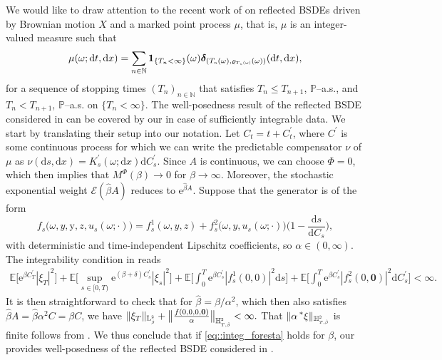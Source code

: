 \documentclass[10pt]{article} %
\newcommand\cE{\mathcal E}
\newcommand{\smalltext}[1]{\text{\fontsize{4}{4}\selectfont$#1$}}
\newcommand{\tinytext}[1]{\text{\fontsize{3}{3}\selectfont$#1$}}
\def \E{\mathbb{E}}
\def \H{\mathbb{H}}
\def \L{\mathbb{L}}
\def \N{\mathbb{N}}
\def \P{\mathbb{P}}
\newcommand{\brs}[1]{\prescript{\ast}{}{#1}}
\def\d{\mathrm{d}}
\begin{document}
We would like to draw attention to the recent work of \citeauthor*{foresta2021optimal} \cite{foresta2021optimal} on reflected BSDEs driven by Brownian motion $X$ and a marked point process $\mu$, that is, $\mu$ is an integer-valued measure such that
\begin{equation*}
	\mu(\omega; \d t, \d x) = \sum_{n \in \N} \mathbf{1}_{\{T_n < \infty\}}(\omega)\boldsymbol{\delta}_{(T_\smalltext{n}(\omega),\varrho_{\smalltext{T}_\tinytext{n}\smalltext{(}\smalltext{\omega}\smalltext{)}}(\omega))}(\d t, \d x),
\end{equation*}
for a sequence of stopping times $(T_n)_{n \in \N}$ that satisfies $T_n \leq T_{n+1}$, $\P$--a.s., and $T_n < T_{n+1}$, $\P$--a.s. on $\{T_n < \infty\}$. The well-posedness result of the reflected BSDE considered in \cite[Theorem 4.1]{foresta2021optimal} can be covered by our  in case of sufficiently integrable data. We start by translating their setup into our notation. Let $C_t = t + C^\prime_t$, where $C^\prime$ is some continuous process for which we can write the predictable compensator $\nu$ of $\mu$ as $\nu(\d s,\d x) = K^\prime_s(\omega;\d x) \d C^\prime_s$. Since $A$ is continuous, we can choose $\Phi = 0$, which then implies that $M^\Phi(\beta) \longrightarrow 0$ for $\beta \longrightarrow \infty$. Moreover, the stochastic exponential weight $\cE(\hat\beta A)$ reduces to $\mathrm{e}^{\hat\beta A}$. Suppose that the generator is of the form
\begin{equation*}
	f_s\big(\omega,y,\mathrm{y},z,u_s(\omega;\cdot)\big) =f^1_s(\omega,y,z) + f^2_s\big(\omega,y,u_s(\omega;\cdot)\big)\bigg(1- \frac{\d s}{\d C_s}\bigg),
\end{equation*}
 with deterministic and time-independent Lipschitz coefficients, so $\alpha \in (0,\infty)$.
The integrability condition in \cite{foresta2021optimal} reads
\begin{align}\label{eq::integ_foresta}
	\E\bigg[ \mathrm{e}^{\beta C^\prime_T} |\xi_T|^2\bigg] + \E\bigg[\sup_{s \in [0,T)} \mathrm{e}^{(\beta +\delta)C^\prime_s} |\xi_s|^2\bigg] + \E\bigg[\int_0^T \mathrm{e}^{\beta C^\prime_s}|f^1_s(0,0)|^2 \d s\bigg] + \E\bigg[\int_0^T \mathrm{e}^{\beta C^\prime_s}|f^2_s(0,\mathbf{0})|^2 \d C^\prime_s\bigg] <\infty.
\end{align}
It is then straightforward to check that for $\hat\beta = \beta/\alpha^2$, which then also satisfies $\hat\beta A = \hat\beta \alpha^2 C = \beta C$, we have $\|\xi_T\|_{\L^\smalltext{2}_\smalltext{\hat\beta}} + \big\|\frac{f(0,0,0,\mathbf{0})}{\alpha}\big\|_{\H^\smalltext{2}_{\smalltext{T}\smalltext{,}\smalltext{\hat\beta}}}  < \infty.$ That $\|\alpha \brs{\xi}\|_{\H^\smalltext{2}_{\smalltext{T}\smalltext{,}\smalltext{\hat\beta}}}$ is finite follows from . We thus conclude that if \eqref{eq::integ_foresta} holds for $\beta$, our  provides well-posedness of the reflected BSDE considered in \cite{foresta2021optimal}.
\end{document}
